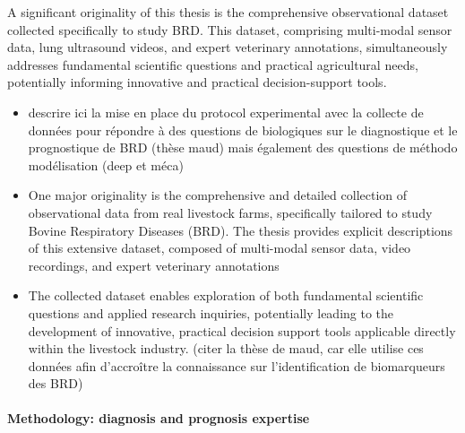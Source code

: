 A significant originality of this thesis is the comprehensive observational dataset collected specifically to study BRD. This dataset, comprising multi-modal sensor data, lung ultrasound videos, and expert veterinary annotations, simultaneously addresses fundamental scientific questions and practical agricultural needs, potentially informing innovative and practical decision-support tools.

\begin{itemize}
    \item descrire ici la mise en place du protocol experimental avec la collecte de données pour répondre à des questions de biologiques sur le diagnostique et le prognostique de BRD (thèse maud) mais également des questions de méthodo modélisation (deep et méca)
    \item One major originality is the comprehensive and detailed collection of observational data from real livestock farms, specifically tailored to study Bovine Respiratory Diseases (BRD). The thesis provides explicit descriptions of this extensive dataset, composed of multi-modal sensor data, video recordings, and expert veterinary annotations
    \item The collected dataset enables exploration of both fundamental scientific questions and applied research inquiries, potentially leading to the development of innovative, practical decision support tools applicable directly within the livestock industry. (citer la thèse de maud, car elle utilise ces données afin d'accroître la connaissance sur l'identification de biomarqueurs des BRD) 
\end{itemize}


\paragraph{Methodology: diagnosis and prognosis expertise}

